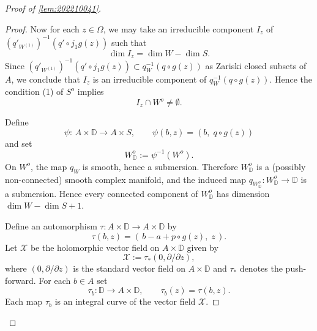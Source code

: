 \documentclass[11pt,english]{smfart}
\theoremstyle{plain}
\theoremstyle{definition}
\theoremstyle{remark}
\numberwithin{equation}{section}
\theoremstyle{plain}
\begin{document}
\begin{proof}[Proof of \cref{lem:202210041}]
\begin{proof}
Now for each $z\in\Omega$, we may take an irreducible component $I_z$ of $(q'_{W^{(1)}})^{-1}(q'\circ j_1g(z))$ such that 
\begin{equation}\label{eqn:20250928}
\dim I_z=\dim W-\dim S.
\end{equation}
Since $(q'_{W^{(1)}})^{-1}(q'\circ j_1g(z))\subset q_W^{-1}(q\circ g(z))$ as Zariski closed subsets of $A$,  we conclude that $I_z$ is an irreducible component of $q_W^{-1}(q\circ g(z))$.
Hence the condition (1) of $S^o$ implies 
\begin{equation}\label{eqn:20250930}
I_z\cap W^o\not=\emptyset.
\end{equation}


Define
$$\psi:\,A\times \mathbb D\to A\times S,\qquad \psi(b,z)=(b,\;q\circ g(z))$$
and set 
$$W^o_{\mathbb D}:=\psi^{-1}(W^o).$$
On $W^o$, the map $q_W$ is smooth, hence a submersion.
Therefore $W^o_{\mathbb D}$ is a (possibly non-connected) smooth complex manifold, and the induced map $q_{W^o_{\mathbb D}}:W^o_{\mathbb D}\to\mathbb D$ is a submersion.
Hence every connected component of $W^o_{\mathbb D}$ has dimension $\dim W-\dim S+1$.


Define an automorphism $\tau:A\times \mathbb D\to A\times \mathbb D$ by
$$\tau(b,z)=(\,b-a+p\circ g(z),\; z\,).$$
Let $\mathcal{X}$ be the holomorphic vector field on $A\times \mathbb D$ given by
$$\mathcal{X}:=\tau_*(0,\partial/\partial z),$$
where $(0,\partial/\partial z)$ is the standard vector field on $A\times \mathbb D$ and
$\tau_*$ denotes the push-forward. For each $b\in A$ set
$$\tau_b:\mathbb D\to A\times \mathbb D,\qquad \tau_b(z)=\tau(b,z).$$
Each map $\tau_b$ is an integral curve of the vector field $\mathcal{X}$.






\end{proof}
\end{proof}
\end{document}
